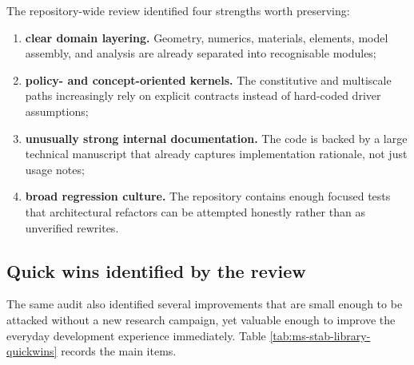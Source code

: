 The repository-wide review identified four strengths worth preserving:
\begin{enumerate}
  \item \textbf{clear domain layering.}  Geometry, numerics, materials,
    elements, model assembly, and analysis are already separated into
    recognisable modules;
  \item \textbf{policy- and concept-oriented kernels.}  The constitutive and
    multiscale paths increasingly rely on explicit contracts instead of
    hard-coded driver assumptions;
  \item \textbf{unusually strong internal documentation.}  The code is backed by
    a large technical manuscript that already captures implementation
    rationale, not just usage notes;
  \item \textbf{broad regression culture.}  The repository contains enough
    focused tests that architectural refactors can be attempted honestly rather
    than as unverified rewrites.
\end{enumerate}

\subsection{Quick wins identified by the review}

The same audit also identified several improvements that are small enough to be
attacked without a new research campaign, yet valuable enough to improve the
everyday development experience immediately.  Table
\ref{tab:ms-stab-library-quickwins} records the main items.

